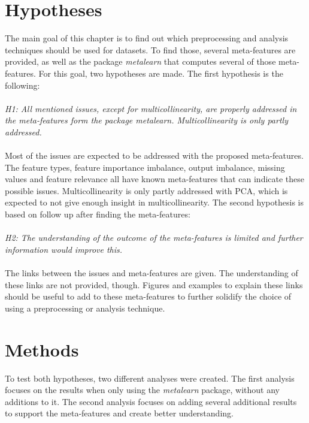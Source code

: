 \documentclass[10pt,a4paper]{report}
\begin{document}
	\section{Hypotheses}
	\label{DEsec:Hypothesis}
	
	The main goal of this chapter is to find out which preprocessing and analysis techniques should be used for datasets. To find those, several meta-features are provided, as well as the package \textit{metalearn} that computes several of those meta-features. For this goal, two hypotheses are made. 
	The first hypothesis is the following: \\
	\\
	
	\textit{H1: All mentioned issues, except for multicollinearity, are properly addressed in the meta-features form the package \textit{metalearn}. Multicollinearity is only partly addressed.} \\
	\\
	Most of the issues are expected to be addressed with the proposed meta-features. The feature types, feature importance imbalance, output imbalance, missing values and feature relevance all have known meta-features that can indicate these possible issues. Multicollinearity is only partly addressed with PCA, which is expected to not give enough insight in multicollinearity. The second hypothesis is based on follow up after finding the meta-features: \\
	\\
	\textit{H2: The understanding of the outcome of the meta-features is limited and further information would improve this.} \\
	\\
	The links between the issues and meta-features are given. The understanding of these links are not provided, though. Figures and examples to explain these links should be useful to add to these meta-features to further solidify the choice of using a preprocessing or analysis technique.
	
	\section{Methods}
	\label{DEsec:Methods}
	
	To test both hypotheses, two different analyses were created. The first analysis focuses on the results when only using the \textit{metalearn} package, without any additions to it. The second analysis focuses on adding several additional results to support the meta-features and create better understanding.
	
\end{document}
